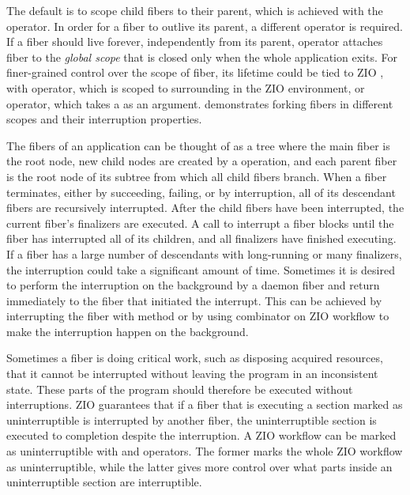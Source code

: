 

The default is to scope child fibers to their parent, which is achieved with the  operator. In order for a fiber to outlive its parent, a different operator is required. If a fiber should live forever, independently from its parent,  operator attaches fiber to the \emph{global scope} that is closed only when the whole application exits. For finer-grained control over the scope of fiber, its lifetime could be tied to ZIO , with  operator, which is scoped to surrounding  in the ZIO environment, or  operator, which takes a  as an argument.  demonstrates forking fibers in different scopes and their interruption properties.



The fibers of an application can be thought of as a tree where the main fiber is the root node, new child nodes are created by a  operation, and each parent fiber is the root node of its subtree from which all child fibers branch. When a fiber terminates, either by succeeding, failing, or by interruption, all of its descendant fibers are recursively interrupted. After the child fibers have been interrupted, the current fiber's finalizers are executed. A call to interrupt a fiber blocks until the fiber has interrupted all of its children, and all finalizers have finished executing. If a fiber has a large number of descendants with long-running or many finalizers, the interruption could take a significant amount of time. Sometimes it is desired to perform the interruption on the background by a daemon fiber and return immediately to the fiber that initiated the interrupt. This can be achieved by interrupting the fiber with  method or by using  combinator on ZIO workflow to make the interruption happen on the background.

Sometimes a fiber is doing critical work, such as disposing acquired resources, that it cannot be interrupted without leaving the program in an inconsistent state. These parts of the program should therefore be executed without interruptions. ZIO guarantees that if a fiber that is executing a section marked as uninterruptible is interrupted by another fiber, the uninterruptible section is executed to completion despite the interruption. A ZIO workflow can be marked as uninterruptible with  and  operators. The former marks the whole ZIO workflow as uninterruptible, while the latter gives more control over what parts inside an uninterruptible section are interruptible.

